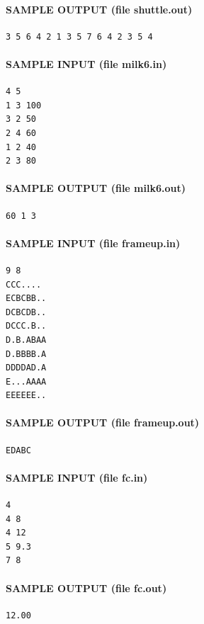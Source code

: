 \documentclass[11pt]{article}
\begin{document}
\paragraph{SAMPLE OUTPUT (file shuttle.out)}
\begin{verbatim}
3 5 6 4 2 1 3 5 7 6 4 2 3 5 4
\end{verbatim}

\paragraph{SAMPLE INPUT (file milk6.in)}
\begin{verbatim}
4 5
1 3 100
3 2 50
2 4 60
1 2 40
2 3 80
\end{verbatim}

\paragraph{SAMPLE OUTPUT (file milk6.out)}
\begin{verbatim}
60 1 3
\end{verbatim}

\paragraph{SAMPLE INPUT (file frameup.in)}
\begin{verbatim}
9 8
CCC....
ECBCBB..
DCBCDB..
DCCC.B..
D.B.ABAA
D.BBBB.A
DDDDAD.A
E...AAAA
EEEEEE..
\end{verbatim}

\paragraph{SAMPLE OUTPUT (file frameup.out)}
\begin{verbatim}
EDABC
\end{verbatim}

\paragraph{SAMPLE INPUT (file fc.in)}
\begin{verbatim}
4
4 8
4 12
5 9.3
7 8
\end{verbatim}

\paragraph{SAMPLE OUTPUT (file fc.out)}
\begin{verbatim}
12.00
\end{verbatim}
\end{document}
